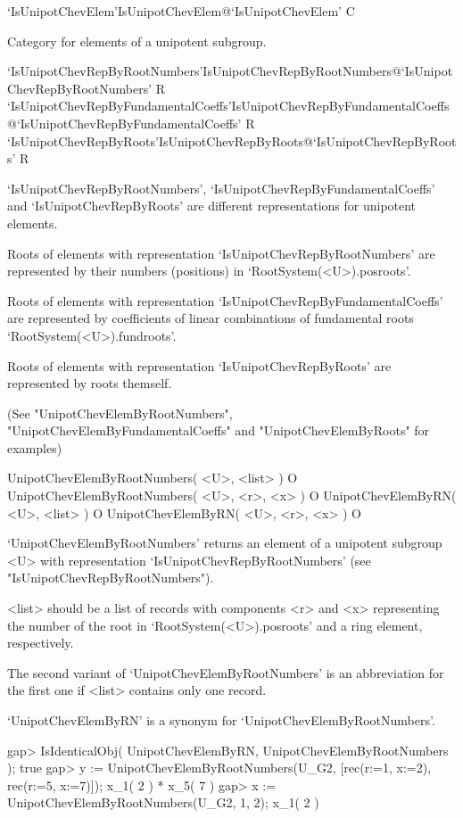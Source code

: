 \>`IsUnipotChevElem'{IsUnipotChevElem}@{`IsUnipotChevElem'} C

Category for elements of a unipotent subgroup.

\>`IsUnipotChevRepByRootNumbers'{IsUnipotChevRepByRootNumbers}@{`IsUnipotChevRepByRootNumbers'} R
\>`IsUnipotChevRepByFundamentalCoeffs'{IsUnipotChevRepByFundamentalCoeffs}@{`IsUnipotChevRepByFundamentalCoeffs'} R
\>`IsUnipotChevRepByRoots'{IsUnipotChevRepByRoots}@{`IsUnipotChevRepByRoots'} R

`IsUnipotChevRepByRootNumbers', `IsUnipotChevRepByFundamentalCoeffs' and
`IsUnipotChevRepByRoots' are different representations for unipotent
elements.

Roots of elements with representation `IsUnipotChevRepByRootNumbers' are
represented by their numbers (positions) in `RootSystem(<U>).posroots'.

Roots of elements with representation `IsUnipotChevRepByFundamentalCoeffs' are
represented by coefficients of linear combinations of fundamental roots
`RootSystem(<U>).fundroots'.

Roots of elements with representation `IsUnipotChevRepByRoots' are
represented by roots themself.

(See "UnipotChevElemByRootNumbers", "UnipotChevElemByFundamentalCoeffs"
 and "UnipotChevElemByRoots" for examples)


\>UnipotChevElemByRootNumbers( <U>, <list> ) O
\>UnipotChevElemByRootNumbers( <U>, <r>, <x> ) O
\>UnipotChevElemByRN( <U>, <list> ) O
\>UnipotChevElemByRN( <U>, <r>, <x> ) O

`UnipotChevElemByRootNumbers' returns an element of a unipotent subgroup
<U> with representation `IsUnipot\-ChevRepByRootNumbers'
(see "IsUnipotChevRepByRootNumbers").

<list> should be a list of records with components <r> and <x>
representing the number of the root in `RootSystem(<U>).posroots' and a
ring element, respectively.

The second variant of `UnipotChevElemByRootNumbers' is an abbreviation
for the first one if <list> contains only one record.

`UnipotChevElemByRN' is a synonym for `UnipotChevElemByRootNumbers'.

\beginexample
gap> IsIdenticalObj( UnipotChevElemByRN, UnipotChevElemByRootNumbers );
true
gap> y := UnipotChevElemByRootNumbers(U_G2, [rec(r:=1, x:=2), rec(r:=5, x:=7)]);
x_{1}( 2 ) * x_{5}( 7 )
gap> x := UnipotChevElemByRootNumbers(U_G2, 1, 2);
x_{1}( 2 )
\endexample

